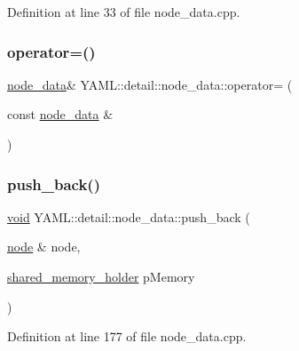 Definition at line 33 of file node\+\_\+data.\+cpp.

\mbox{\label{class_y_a_m_l_1_1detail_1_1node__data_a7146772c06963d618f57a2c5653cd915}} 
\subsubsection{\texorpdfstring{operator=()}{operator=()}}
{\footnotesize\ttfamily \mbox{\hyperlink{class_y_a_m_l_1_1detail_1_1node__data}{node\+\_\+data}}\& Y\+A\+M\+L\+::detail\+::node\+\_\+data\+::operator= (\begin{DoxyParamCaption}\item[{const \mbox{\hyperlink{class_y_a_m_l_1_1detail_1_1node__data}{node\+\_\+data}} \&}]{ }\end{DoxyParamCaption})\hspace{0.3cm}{\ttfamily [delete]}}

\mbox{\label{class_y_a_m_l_1_1detail_1_1node__data_a76de77be8b4233497aa0b9be17051907}} 
\subsubsection{\texorpdfstring{push\_back()}{push\_back()}}
{\footnotesize\ttfamily \mbox{\hyperlink{glad_8h_a950fc91edb4504f62f1c577bf4727c29}{void}} Y\+A\+M\+L\+::detail\+::node\+\_\+data\+::push\+\_\+back (\begin{DoxyParamCaption}\item[{\mbox{\hyperlink{class_y_a_m_l_1_1detail_1_1node}{node}} \&}]{node,  }\item[{\mbox{\hyperlink{namespace_y_a_m_l_1_1detail_a228c4b3b6ba1058b474d40afc218e21d}{shared\+\_\+memory\+\_\+holder}}}]{p\+Memory }\end{DoxyParamCaption})}



Definition at line 177 of file node\+\_\+data.\+cpp.

\mbox{\label{class_y_a_m_l_1_1detail_1_1node__data_aec83cdc1932b604c83c76cea09a9e3a1}} 
